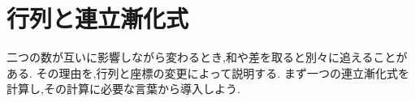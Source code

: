 \chapter{行列と連立漸化式}\label{章：行列と連立漸化式}
\begin{bookcolumns}
二つの数が互いに影響しながら変わるとき,和や差を取ると別々に追えることがある.
その理由を,行列と座標の変更によって説明する.
まず一つの連立漸化式を計算し,その計算に必要な言葉から導入しよう.



\end{bookcolumns}
